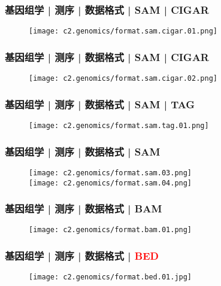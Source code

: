 \begin{frame}
  \frametitle{基因组学 | 测序 | 数据格式 | SAM | CIGAR}
  \begin{figure}
    \centering
    \texttt{[image: c2.genomics/format.sam.cigar.01.png]}
  \end{figure}
\end{frame}

\begin{frame}
  \frametitle{基因组学 | 测序 | 数据格式 | SAM | CIGAR}
  \begin{figure}
    \centering
    \texttt{[image: c2.genomics/format.sam.cigar.02.png]}
  \end{figure}
\end{frame}

\begin{frame}
  \frametitle{基因组学 | 测序 | 数据格式 | SAM | TAG}
  \begin{figure}
    \centering
    \texttt{[image: c2.genomics/format.sam.tag.01.png]}
  \end{figure}
\end{frame}

\begin{frame}
  \frametitle{基因组学 | 测序 | 数据格式 | SAM}
  \begin{figure}
    \centering
    \texttt{[image: c2.genomics/format.sam.03.png]}\\
    \vspace{1em}
    \texttt{[image: c2.genomics/format.sam.04.png]}
  \end{figure}
\end{frame}
    
\begin{frame}
  \frametitle{基因组学 | 测序 | 数据格式 | BAM}
  \begin{figure}
    \centering
    \texttt{[image: c2.genomics/format.bam.01.png]}
  \end{figure}
\end{frame}
    
\begin{frame}
  \frametitle{基因组学 | 测序 | 数据格式 | \textcolor{red}{BED}}
  \begin{figure}
    \centering
    \texttt{[image: c2.genomics/format.bed.01.jpg]}
  \end{figure}
\end{frame}


